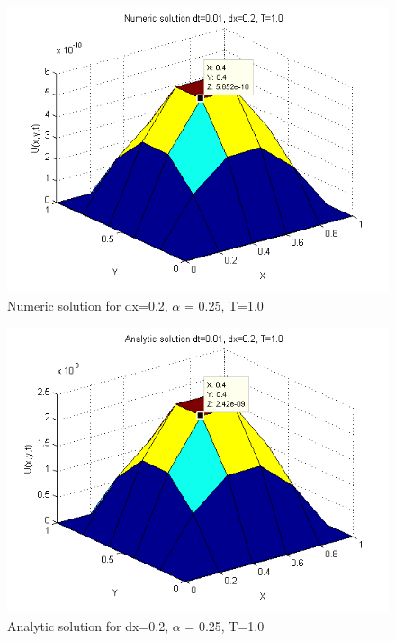 \documentclass[a4paper,10pt]{article}
\begin{document}
\begin{figure}
  \begin{center}
    \includegraphics[scale=0.5]{num_dt001_dx02_T10}
    \caption{Numeric solution for dx=0.2, $\alpha$ = 0.25, T=1.0}
    \label{fig:Num_dx0.2}
  \end{center}

\end{figure}

\begin{figure}
  \begin{center}
    \includegraphics[scale=0.5]{ana_dt001_dx02_T10}
    \caption{Analytic solution for dx=0.2, $\alpha$ = 0.25, T=1.0}
    \label{fig:Ana_dx0.2}
  \end{center}

\end{figure}
\end{document}
